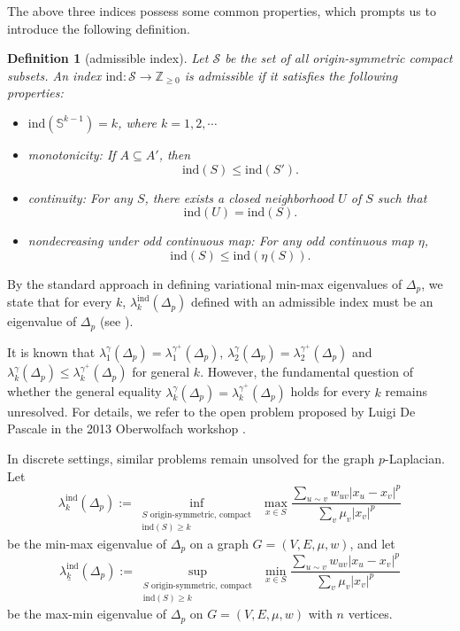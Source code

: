 \documentclass[12pt, reqno]{article}
\newtheorem{defn}%
{Definition}
\begin{document}
The above three indices possess some common properties, which prompts us to introduce the following definition.

\begin{defn}[admissible index]
Let $\mathcal{S}$ be the set of all origin-symmetric compact subsets. 
An index $\mathrm{ind}:\mathcal{S}\to \mathbb{Z}_{\ge0}$ is \emph{admissible} if it satisfies the following properties:
\begin{itemize}
\item[(1)] %
$\mathrm{ind}(\mathbb{S}^{k-1})=k$, where $k=1,2,\cdots$
\item[(2)] monotonicity: If $A\subseteq A'$, then $$\mathrm{ind}(S)\le \mathrm{ind}(S').$$
\item[(3)] continuity: For any $S$, there exists a closed neighborhood $U$ of $S$ such that $$\mathrm{ind}(U)= \mathrm{ind}(S).$$
\item[(4)] nondecreasing under odd continuous map: For any odd continuous map $\eta$, $$\mathrm{ind}(S)\le  \mathrm{ind}(\eta(S)).$$
\end{itemize}
\end{defn}

By the standard approach in defining variational min-max eigenvalues of $\Delta_p$, we state that for every $k$, $\lambda_k^{\mathrm{ind}}(\Delta_p)$ defined with an admissible index must be an eigenvalue of $\Delta_p$ (see \cite{DTZ,Zhang}). 

It is known that $\lambda_1^{\gamma}(\Delta_p)= \lambda_1^{\gamma^+}(\Delta_p)$, $\lambda_2^{\gamma}(\Delta_p)= \lambda_2^{\gamma^+}(\Delta_p)$ and $\lambda_k^{\gamma}(\Delta_p)\le \lambda_k^{\gamma^+}(\Delta_p)$ for general $k$. However, the fundamental question of whether the general equality $\lambda_k^{\gamma}(\Delta_p)= \lambda_k^{\gamma^+}(\Delta_p)$ holds for every $k$ remains unresolved. For details, we refer to the open problem proposed by Luigi De Pascale in the 2013 Oberwolfach workshop \cite{Diening}.

In discrete settings, similar problems remain unsolved for the graph $p$-Laplacian. Let 
\begin{equation}\label{eq:discrete}
\lambda_k^{\mathrm{ind}}(\Delta_p):=\inf_{\substack{S\text{ origin-symmetric, compact}\\\mathrm{ind}(S)\ge k}}~\max_{x\in S}\frac{\sum\limits_{u\sim v}w_{uv}|x_u-x_v|^p}{\sum\limits_v\mu_v|x_v|^p} 
\end{equation}
be the min-max eigenvalue of $\Delta_p$ on a graph $G=(V,E,\mu,w)$, and let
\begin{equation}\label{eq:discrete/maxmin}
\underline{\lambda_k^{\mathrm{ind}}}(\Delta_p):=\sup_{\substack{S\text{ origin-symmetric, compact}\\\mathrm{ind}(S)\ge k}}~\min_{x\in S}\frac{\sum\limits_{u\sim v}w_{uv}|x_u-x_v|^p}{\sum\limits_v\mu_v|x_v|^p} 
\end{equation}
be the max-min eigenvalue of $\Delta_p$ on $G=(V,E,\mu,w)$ with $n$ vertices. 
\end{document}
